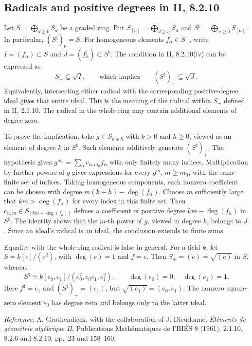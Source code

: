 \subsection*{Radicals and positive degrees in II, 8.2.10}

Let $S=\bigoplus_{d\geq0}S_d$ be a graded ring. Put
$S_{[n]}=\bigoplus_{d\geq n}S_d$ and
$S^\natural=\bigoplus_{n\geq0}S_{[n]}$. In particular,
$(S^\natural)_0=S$. For homogeneous elements $f_\alpha\in S_+$,
write $I=(f_\alpha)\subset S$ and
$J=(f_\alpha^\natural)\subset S^\natural$.
The condition in II, 8.2.10(iv) can be expressed as
\[
 S_+\subseteq\sqrt I,
 \qquad\text{which implies}\qquad
 (S^\natural)_+\subseteq\sqrt J.
\]
Equivalently, intersecting either radical with the corresponding
positive-degree ideal gives that entire ideal. This is the meaning
of the radical within $S_+$ defined in II, 2.1.10. The radical in
the whole ring may contain additional elements of degree zero.

To prove the implication, take $g\in S_{k+h}$ with $k>0$ and
$h\geq0$, viewed as an element of degree $k$ in $S^\natural$.
Such elements additively generate $(S^\natural)_+$.
The hypothesis gives $g^{m_0}=\sum_\alpha c_{\alpha,m_0}f_\alpha$
with only finitely many indices. Multiplication by further powers
of $g$ gives expressions for every $g^m$, $m\geq m_0$, with
the same finite set of indices. Taking homogeneous components,
each nonzero coefficient can be chosen with degree
$m(k+h)-\deg(f_\alpha)$. Choose $m$ sufficiently large that
$km>\deg(f_\alpha)$ for every index in this finite set.
Then $c_{\alpha,m}\in S_{[km-\deg(f_\alpha)]}$ defines a
coefficient of positive degree $km-\deg(f_\alpha)$ in
$S^\natural$. The identity shows that the $m$-th power of $g$,
viewed in degree $k$, belongs to $J$. Since an ideal's radical
is an ideal, the conclusion extends to finite sums.

Equality with the whole-ring radical is false in general.
For a field $k$, let $S=k[e]/(e^2)$, with $\deg(e)=1$ and $f=e$.
Then $S_+=(e)=\sqrt{(e)}$ in $S$, whereas
\[
 S^\natural\simeq k[e_0,e_1]/(e_0^2,e_0e_1,e_1^2),
 \qquad \deg(e_0)=0,\quad\deg(e_1)=1.
\]
Here $f^\natural=e_1$ and $(S^\natural)_+=(e_1)$, but
$\sqrt{(e_1)}=(e_0,e_1)$. The nonzero square-zero element
$e_0$ has degree zero and belongs only to the latter ideal.

\noindent\emph{Reference:} A. Grothendieck, with the collaboration
of J. Dieudonné, \emph{Éléments de géométrie algébrique II},
Publications Mathématiques de l'IHÉS 8 (1961), 2.1.10,
8.2.6 and 8.2.10, pp.~23 and 158--160.

